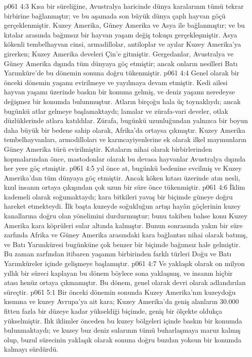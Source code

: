 \vs p061 4:3 Kısa bir süreliğine, Avustralya haricinde dünya karalarının tümü tekrar birbirine bağlanmıştır; ve bu aşamada son büyük dünya çaplı hayvan göçü gerçeklenmiştir. Kuzey Amerika, Güney Amerika ve Asya ile bağlanmıştır; ve bu kıtalar arasında bağımsız bir hayvan yaşam değiş tokuşu gerçekleşmiştir. Asya kökenli tembelhayvan cinsi, armadillolar, antiloplar ve ayılar Kuzey Amerika’ya girerken; Kuzey Amerika develeri Çin’e gitmiştir. Gergedanlar, Avustralya ve Güney Amerika dışında tüm dünyaya göç etmiştir; ancak onların nesilleri Batı Yarımküre’de bu dönemin sonuna doğru tükenmiştir.
\vs p061 4:4 Genel olarak bir önceki dönemin yaşamı evirilmeye ve yayılmaya devam etmiştir. Kedi ailesi hayvan yaşamı üzerinde baskın bir konuma gelmiş, ve deniz yaşamı neredeyse değişmez bir konumda bulunmuştur. Atların birçoğu hala üç toynaklıydı; ancak bugünkü atlar gelmeye başlamaktaydı; lamalar ve zürafa\hyp{}vari develer, otlak düzlüklerinde atlara katıldılar. Zürafa, bugünkü uzunluğundan yalnızca bir boyun daha büyük bir bedene sahip olarak, Afrika’da ortaysa çıkmıştır. Kuzey Amerika tembelhayvanları, armodilloları ve karıncayiyenlerine ek olarak ilkel maymunların Güney Amerika türü evirilmiştir. Kıtaların nihai olarak birbirlerinden kopmalarından önce, mastodonlar olarak bu devasa hayvanlar Avustralya dışında her yere göç etmiştir.
\vs p061 4:5  yıl önce at, bugünkü bedenine evcilmiş ve Kuzey Amerika’dan tüm dünyaya göç etmiştir. Ancak köken kıtası üzerinde atın nesli, kızıl insanın ortaya çıkışından çok uzun bir süre önce tükenmiştir.
\vs p061 4:6 İklim kademeli olarak soğumaktaydı; kara bitkileri yavaş bir biçimde güneye doğru hareket etmekteydi. İlk başta kuzeyde soğukluğun artışı hayân göçlerinin kuzey kanallarına doğru olan yönelimini durdurmuştur; bunu takiben bahse konu Kuzey Amerika kara köprüleri sular altında kalmıştır. Bunun sonrasında yakın bir süre zarfında Afrika ve Güney Amerika arasındaki kara bağlantısı nihai olarak batmış, ve Batı Yarımküresi bugünküne çok benzer bir biçimde bağımsız hale gelmiştir. Bu zaman zarfından itibaren yaşamın birbirinden farklı türleri Doğu ve Batı Yarımküreler içinde gelişmeye başlamıştır.
\vs p061 4:7 Ve yaklaşık olarak on milyon yıllık bir süreci kaplayan bu dönem böylece sona yaklaşmış, ve insanın hiçbir atası henüz ortaya çıkmamıştır. Bu dönem, genel olarak  devri olarak adlandırılan süreçtir.
\vs p061 5:1 Bir önceki dönemin sonunda Kuzey Amerika’nın kuzeydoğu kısmına ve kuzey Avrupa’ya ait kara; Kuzey Amerika’da geniş alanların 30.000 fitten fazla bir düzeye kadar yükseldiği biçimde, geniş bir ölçekte oldukça yükselmiştir. Ilık iklimler önceden bu kuzey bölgeleri içinde baskın bir konumda bulunmaktaydı; ve kuzey buz deniz sularının tümü buharlaşmaya maruz kalmış olup, buzul sürecinin yaklaşık olarak sonuna doğru buzdan yoksun bir konumda kalmayı sürdürdü.
